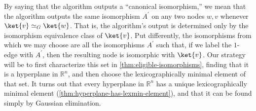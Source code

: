 By saying that the algorithm outputs a ``canonical isomorphism,'' we mean that the algorithm outputs the same isomorphism $A^\prime$ on any two nodes $w,v$ whenever $\ket{v}\simeq_G\ket{w}$.
That is, the algorithm's output is determined only by the isomorphism equivalence class of $\ket{v}$.
Put differently, the isomorphisms from which we may choose are all the isomorphisms $A^\prime$ such that, if we label the $1$-edge with $A^\prime$, then the resulting node is isomorphic with $\ket{v}$.
Our strategy will be to first characterize this set in \autoref{thm:eligible-isomorphisms}, finding that it is a hyperplane in $\mathbb R^n$, and then choose the lexicographically minimal element of that set.
It turns out that every hyperplane in $\mathbb R^n$ has a unique lexicographically minimal element (\autoref{thm:hyperplane-has-lexmin-element}), and that it can be found simply by Gaussian elimination.


